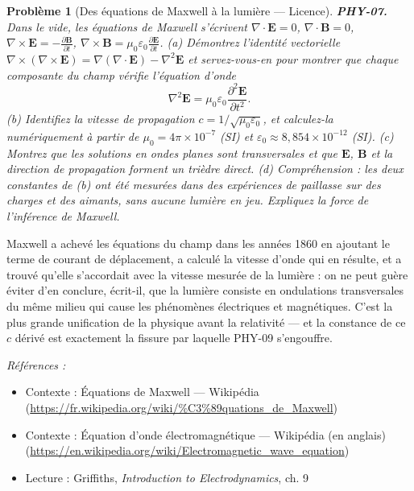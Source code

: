 \documentclass[11pt]{article}
\newtheorem{problem}{Problème}
\newenvironment{refs}{\par\small\noindent\emph{Références :}\begin{itemize}\setlength\itemsep{0pt}}{\end{itemize}\normalsize}
\begin{document}
\bigskip

\begin{problem}[{Des équations de Maxwell à la lumière --- Licence}]
\textbf{PHY-07.} Dans le vide, les équations de Maxwell s'écrivent
$\nabla \cdot \mathbf{E} = 0$, $\nabla \cdot \mathbf{B} = 0$,
$\nabla \times \mathbf{E} = -\frac{\partial \mathbf{B}}{\partial t}$,
$\nabla \times \mathbf{B} = \mu_0 \varepsilon_0 \frac{\partial \mathbf{E}}{\partial t}$.
(a) Démontrez l'identité vectorielle
$\nabla \times (\nabla \times \mathbf{E}) = \nabla(\nabla \cdot \mathbf{E}) - \nabla^2 \mathbf{E}$
et servez-vous-en pour montrer que chaque composante du champ vérifie l'équation d'onde
\[ \nabla^2 \mathbf{E} = \mu_0 \varepsilon_0 \frac{\partial^2 \mathbf{E}}{\partial t^2}. \]
(b) Identifiez la vitesse de propagation $c = 1/\sqrt{\mu_0 \varepsilon_0}$, et calculez-la
numériquement à partir de $\mu_0 = 4\pi \times 10^{-7}$ (SI) et
$\varepsilon_0 \approx 8{,}854 \times 10^{-12}$ (SI). (c) Montrez que les solutions en ondes
planes sont transversales et que $\mathbf{E}$, $\mathbf{B}$ et la direction de propagation
forment un trièdre direct. (d) Compréhension : les deux constantes de (b) ont été mesurées dans
des expériences de paillasse sur des charges et des aimants, sans aucune lumière en jeu.
Expliquez la force de l'inférence de Maxwell.
\end{problem}

\noindent Maxwell a achevé les équations du champ dans les années 1860 en ajoutant le
terme de courant de déplacement, a calculé la vitesse d'onde qui en résulte, et a trouvé qu'elle
s'accordait avec la vitesse mesurée de la lumière : on ne peut guère éviter d'en conclure, écrit-il,
que la lumière consiste en ondulations transversales du même milieu qui cause les phénomènes
électriques et magnétiques. C'est la plus grande unification de la physique avant la relativité ---
et la constance de ce $c$ dérivé est exactement la fissure par laquelle PHY-09 s'engouffre.

\begin{refs}
\item Contexte : Équations de Maxwell --- Wikipédia (\url{https://fr.wikipedia.org/wiki/%C3%89quations_de_Maxwell})
\item Contexte : Équation d'onde électromagnétique --- Wikipédia (en anglais) (\url{https://en.wikipedia.org/wiki/Electromagnetic_wave_equation})
\item Lecture : Griffiths, \textit{Introduction to Electrodynamics}, ch. 9
\end{refs}
\end{document}
